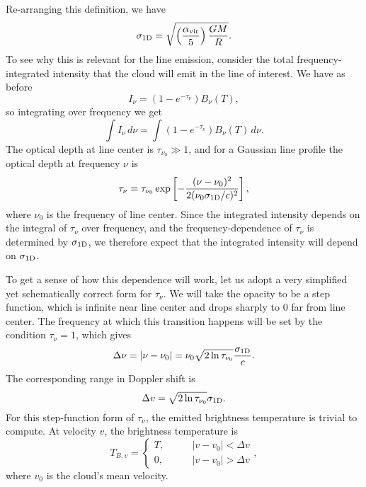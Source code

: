 Re-arranging this definition, we have
\begin{equation}
\sigma_{\rm 1D} = \sqrt{\left(\frac{\alpha_{\mathrm{vir}}}{5}\right)\frac{GM}{R}}.
\end{equation}
To see why this is relevant for the line emission, consider the total frequency-integrated intensity that the cloud will emit in the line of interest. We have as before
\begin{equation}
I_{\nu} = \left(1-e^{-\tau_{\nu}}\right) B_{\nu}(T),
\end{equation}
so integrating over frequency we get
\begin{equation}
\int I_{\nu}\,d\nu = \int \left(1-e^{-\tau_{\nu}}\right) B_{\nu}(T)\,d\nu.
\end{equation}
The optical depth at line center is $\tau_{\nu_0}\gg 1$, and for a Gaussian line profile the optical depth at frequency $\nu$ is
\begin{equation}
\tau_{\nu} =\tau_{\nu_0} \exp\left[-\frac{(\nu-\nu_0)^2}{2 (\nu_0 \sigma_{\rm 1D}/c)^2}\right],
\end{equation}
where $\nu_0$ is the frequency of line center. Since the integrated intensity depends on the integral of $\tau_{\nu}$ over frequency, and the frequency-dependence of $\tau_{\nu}$ is determined by $\sigma_{\rm 1D}$, we therefore expect that the integrated intensity will depend on $\sigma_{\rm 1D}$.  

To get a sense of how this dependence will work, let us adopt a very simplified yet schematically correct form for $\tau_{\nu}$. We will take the opacity to be a step function, which is infinite near line center and drops sharply to 0 far from line center. The frequency at which this transition happens will be set by the condition $\tau_{\nu}=1$, which gives
\begin{equation}
\Delta \nu = |\nu-\nu_0| = \nu_0 \sqrt{2\ln \tau_{\nu_0}} \frac{\sigma_{\rm 1D}}{c}.
\end{equation}
The corresponding range in Doppler shift is
\begin{equation}
\Delta v = \sqrt{2\ln \tau_{\nu_0}} \sigma_{\rm 1D}.
\end{equation}
For this step-function form of $\tau_{\nu}$, the emitted brightness temperature is trivial to compute. At velocity $v$, the brightness temperature is
\begin{equation}
T_{B,v} = \left\{
\begin{array}{ll}
T, \qquad & |v-v_0| < \Delta v \\
0, &  |v-v_0| > \Delta v
\end{array}
\right.,
\end{equation}
where $v_0$ is the cloud's mean velocity.

